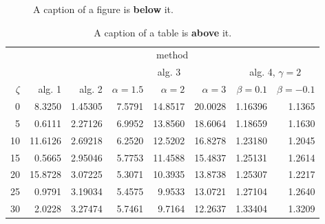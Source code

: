 \documentclass[a4paper,twoside,12pt]{book}
\begin{document}
\begin{figure}
\centering
{}
\caption{A caption of a figure is \textbf{below} it.}
\label{fig:2}
\end{figure}

\begin{table}
\centering
\caption{A caption of a table is \textbf{above} it.}
\label{id:tab:wyniki}
\begin{tabular}{rrrrrrrr}
\toprule
	         &                                     \multicolumn{7}{c}{method}                                      \\
	         \cmidrule{2-8}
	         &         &         &        \multicolumn{3}{c}{alg. 3}        & \multicolumn{2}{c}{alg. 4, $\gamma = 2$} \\
	         \cmidrule(r){4-6}\cmidrule(r){7-8}
	$\zeta$ &     alg. 1 &   alg. 2 & $\alpha= 1.5$ & $\alpha= 2$ & $\alpha= 3$ &   $\beta = 0.1$  &   $\beta = -0.1$ \\
\midrule
	       0 &  8.3250 & 1.45305 &       7.5791 &    14.8517 &    20.0028 & 1.16396 &                       1.1365 \\
	       5 &  0.6111 & 2.27126 &       6.9952 &    13.8560 &    18.6064 & 1.18659 &                       1.1630 \\
	      10 & 11.6126 & 2.69218 &       6.2520 &    12.5202 &    16.8278 & 1.23180 &                       1.2045 \\
	      15 &  0.5665 & 2.95046 &       5.7753 &    11.4588 &    15.4837 & 1.25131 &                       1.2614 \\
	      20 & 15.8728 & 3.07225 &       5.3071 &    10.3935 &    13.8738 & 1.25307 &                       1.2217 \\
	      25 &  0.9791 & 3.19034 &       5.4575 &     9.9533 &    13.0721 & 1.27104 &                       1.2640 \\
	      30 &  2.0228 & 3.27474 &       5.7461 &     9.7164 &    12.2637 & 1.33404 &                       1.3209 \\

\end{tabular}
\end{table}
\end{document}

